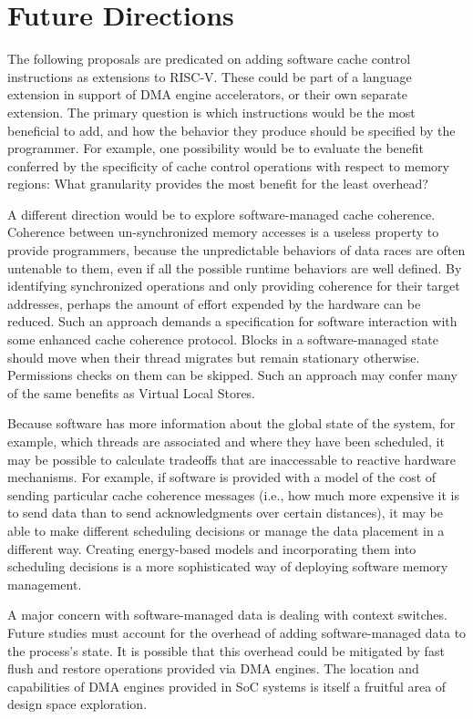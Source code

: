 \section{Future Directions}

The following proposals are predicated on adding software cache control instructions as extensions to RISC-V.
These could be part of a language extension in support of DMA engine accelerators, or their own separate extension.
The primary question is which instructions would be the most beneficial to add, and how the behavior they produce should be specified
by the programmer.
For example, one possibility would be to evaluate the benefit conferred by the specificity of cache control operations
with respect to memory regions:
What granularity provides the most benefit for the least overhead?

A different direction would be to explore software-managed cache coherence.
Coherence between un-synchronized memory accesses is a useless property to provide programmers, because the unpredictable behaviors
of data races are often untenable to them, even if all the possible runtime behaviors are well defined.
By identifying synchronized operations and only providing coherence for their target addresses, perhaps the amount of effort
expended by the hardware can be reduced.
Such an approach demands a specification for software interaction with some enhanced cache coherence protocol.
Blocks in a software-managed state should move when their thread migrates but remain stationary otherwise.
Permissions checks on them can be skipped.
Such an approach may confer many of the same benefits as Virtual Local Stores.

Because software has more information about the global state of the system, for example, which threads are associated
and where they have been scheduled, it may be possible to calculate tradeoffs that are inaccessable to reactive hardware mechanisms.
For example, if software is provided with a model of the cost of sending particular cache coherence messages (i.e., how much more expensive it is to send data than to send acknowledgments over certain distances), it may be able to make different scheduling decisions
or manage the data placement in a different way.
Creating energy-based models and incorporating them into scheduling decisions is a more sophisticated way
of deploying software memory management.

A major concern with software-managed data is dealing with context switches.
Future studies must account for the overhead of adding software-managed data to the process's state.
It is possible that this overhead could be mitigated by fast flush and restore operations provided via DMA engines.
The location and capabilities of DMA engines provided in SoC systems is itself a fruitful area of design space exploration.


